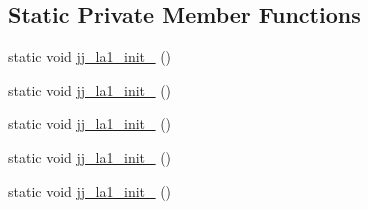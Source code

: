 \subsection*{Static Private Member Functions}
\begin{DoxyCompactItemize}
\item 
static void \hyperlink{classorg_1_1coode_1_1owlapi_1_1functionalparser_1_1_o_w_l_functional_syntax_parser_acc6b200270252a57471c6be4524d9351}{jj\-\_\-la1\-\_\-init\-\_} ()
\item 
static void \hyperlink{classorg_1_1coode_1_1owlapi_1_1functionalparser_1_1_o_w_l_functional_syntax_parser_a0b3f5f01c200d7828de05f02f2ab4894}{jj\-\_\-la1\-\_\-init\-\_} ()
\item 
static void \hyperlink{classorg_1_1coode_1_1owlapi_1_1functionalparser_1_1_o_w_l_functional_syntax_parser_a684b078377e284f96e206171416b1743}{jj\-\_\-la1\-\_\-init\-\_} ()
\item 
static void \hyperlink{classorg_1_1coode_1_1owlapi_1_1functionalparser_1_1_o_w_l_functional_syntax_parser_a0f0ca82347f706cf12216bdfe686bdbf}{jj\-\_\-la1\-\_\-init\-\_} ()
\item 
static void \hyperlink{classorg_1_1coode_1_1owlapi_1_1functionalparser_1_1_o_w_l_functional_syntax_parser_a63235d9da1b1a9a993b850ad731b462a}{jj\-\_\-la1\-\_\-init\-\_} ()
\end{DoxyCompactItemize}
